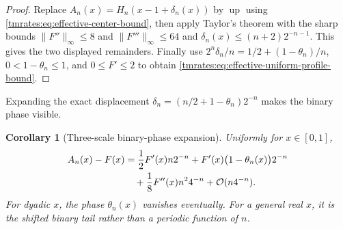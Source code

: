 \documentclass[11pt,oneside]{article}
\newtheorem{corollary}[corollary]{Corollary}
\theoremstyle{definition}
\theoremstyle{remark}
\newcommand{\Up}{\operatorname{up}}
\newcommand{\bigO}{\mathcal O}
\begin{document}
\begin{proof}
Replace \(A_n(x)=H_n(x-1+\delta_n(x))\) by \(\Up\) using
\eqref{tmrates:eq:effective-center-bound}, then apply Taylor's theorem with the sharp
bounds \(\|F''\|_\infty\leq8\) and \(\|F'''\|_\infty\leq64\) and
\(\delta_n(x)\leq(n+2)2^{-n-1}\).  This gives the two displayed remainders.  Finally use
\(2^n\delta_n/n=1/2+(1-\theta_n)/n\), \(0<1-\theta_n\leq1\), and
\(0\leq F'\leq2\) to obtain \eqref{tmrates:eq:effective-uniform-profile-bound}.
\end{proof}

Expanding the exact displacement
$\delta_n=(n/2+1-\theta_n)2^{-n}$ makes the binary phase visible.
\begin{corollary}[Three-scale binary-phase expansion]
\label{tmrates:cor:binary-phase}
Uniformly for $x\in[0,1]$,
\begin{align}
 A_n(x)-F(x)
 &=\frac12F'(x)n2^{-n}
   +F'(x)\bigl(1-\theta_n(x)\bigr)2^{-n}\notag\\
 &\quad+\frac18F''(x)n^2 4^{-n}+\bigO(n4^{-n}).
 \label{tmrates:eq:binary-phase-expansion}
\end{align}
For dyadic $x$, the phase $\theta_n(x)$ vanishes eventually.  For a general real
$x$, it is the shifted binary tail rather than a periodic function of $n$.
\end{corollary}
\end{document}
